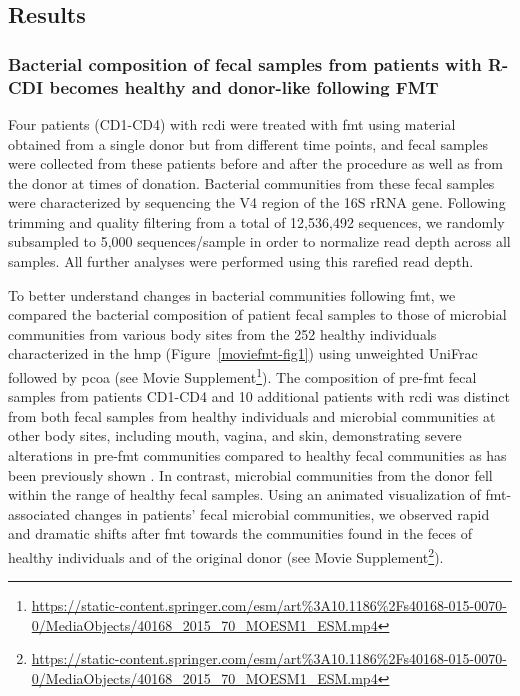 \subsection{Results}
\subsubsection{Bacterial composition of fecal samples from patients with R-CDI becomes healthy and donor-like following FMT}

Four patients (CD1-CD4) with \gls{rcdi} were treated with \gls{fmt} using material obtained from a single donor but from different time points, and fecal samples were collected from these patients before and after the procedure as well as from the donor at times of donation. Bacterial communities from these fecal samples were characterized by sequencing the V4 region of the 16S rRNA gene. Following trimming and quality filtering from a total of 12,536,492 sequences, we randomly subsampled to 5,000 sequences/sample in order to normalize read depth across all samples. All further analyses were performed using this rarefied read depth.

To better understand changes in bacterial communities following \gls{fmt}, we compared the bacterial composition of patient fecal samples to those of microbial communities from various body sites from the 252 healthy individuals characterized in the \gls{hmp} \cite{RN4040} (Figure~\ref{moviefmt-fig1}) using unweighted UniFrac \cite{RN83} followed by \gls{pcoa} \cite{RN110} (see Movie Supplement\footnote{\url{https://static-content.springer.com/esm/art\%3A10.1186\%2Fs40168-015-0070-0/MediaObjects/40168_2015_70_MOESM1_ESM.mp4}}). The composition of pre-\gls{fmt} fecal samples from patients CD1-CD4 and 10 additional patients with \gls{rcdi} was distinct from both fecal samples from healthy individuals and microbial communities at other body sites, including mouth, vagina, and skin, demonstrating severe alterations in pre-\gls{fmt} communities compared to healthy fecal communities as has been previously shown \cite{RN30, RN4129}. In contrast, microbial communities from the donor fell within the range of healthy fecal samples. Using an animated visualization of \gls{fmt}-associated changes in patients' fecal microbial communities, we observed rapid and dramatic shifts after \gls{fmt} towards the communities found in the feces of healthy individuals and of the original donor (see Movie Supplement\footnote{\label{supmoviefmt}\url{https://static-content.springer.com/esm/art\%3A10.1186\%2Fs40168-015-0070-0/MediaObjects/40168_2015_70_MOESM1_ESM.mp4}}).

